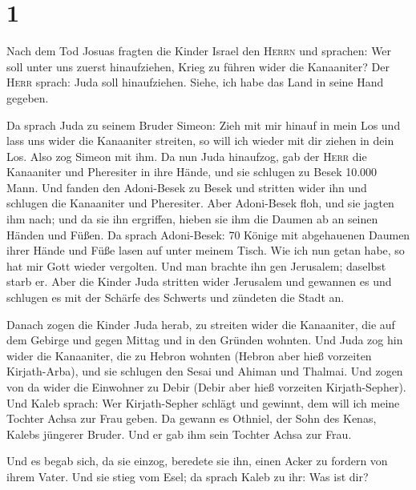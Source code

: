 \hypertarget{section}{%
\section{1}\label{section}}

 Nach dem Tod Josuas fragten die Kinder Israel den
\textsc{Herrn} und sprachen: Wer soll unter uns zuerst hinaufziehen,
Krieg zu führen wider die Kanaaniter?  Der \textsc{Herr}
sprach: Juda soll hinaufziehen. Siehe, ich habe das Land in seine Hand
gegeben.

 Da sprach Juda zu seinem Bruder Simeon: Zieh mit mir
hinauf in mein Los und lass uns wider die Kanaaniter streiten, so will
ich wieder mit dir ziehen in dein Los. Also zog Simeon mit ihm.
 Da nun Juda hinaufzog, gab der \textsc{Herr} die
Kanaaniter und Pheresiter in ihre Hände, und sie schlugen zu Besek
10.000 Mann.  Und fanden den Adoni-Besek zu Besek und
stritten wider ihn und schlugen die Kanaaniter und Pheresiter.
 Aber Adoni-Besek floh, und sie jagten ihm nach; und da
sie ihn ergriffen, hieben sie ihm die Daumen ab an seinen Händen und
Füßen.  Da sprach Adoni-Besek: 70 Könige mit abgehauenen
Daumen ihrer Hände und Füße lasen auf unter meinem Tisch. Wie ich nun
getan habe, so hat mir Gott wieder vergolten. Und man brachte ihn gen
Jerusalem; daselbst starb er.  Aber die Kinder Juda
stritten wider Jerusalem und gewannen es und schlugen es mit der Schärfe
des Schwerts und zündeten die Stadt an.

 Danach zogen die Kinder Juda herab, zu streiten wider die
Kanaaniter, die auf dem Gebirge und gegen Mittag und in den Gründen
wohnten.  Und Juda zog hin wider die Kanaaniter, die zu
Hebron wohnten (Hebron aber hieß vorzeiten Kirjath-Arba), und sie
schlugen den Sesai und Ahiman und Thalmai.  Und zogen von
da wider die Einwohner zu Debir (Debir aber hieß vorzeiten
Kirjath-Sepher).  Und Kaleb sprach: Wer Kirjath-Sepher
schlägt und gewinnt, dem will ich meine Tochter Achsa zur Frau geben.
 Da gewann es Othniel, der Sohn des Kenas, Kalebs
jüngerer Bruder. Und er gab ihm sein Tochter Achsa zur Frau.

 Und es begab sich, da sie einzog, beredete sie ihn,
einen Acker zu fordern von ihrem Vater. Und sie stieg vom Esel; da
sprach Kaleb zu ihr: Was ist dir?


